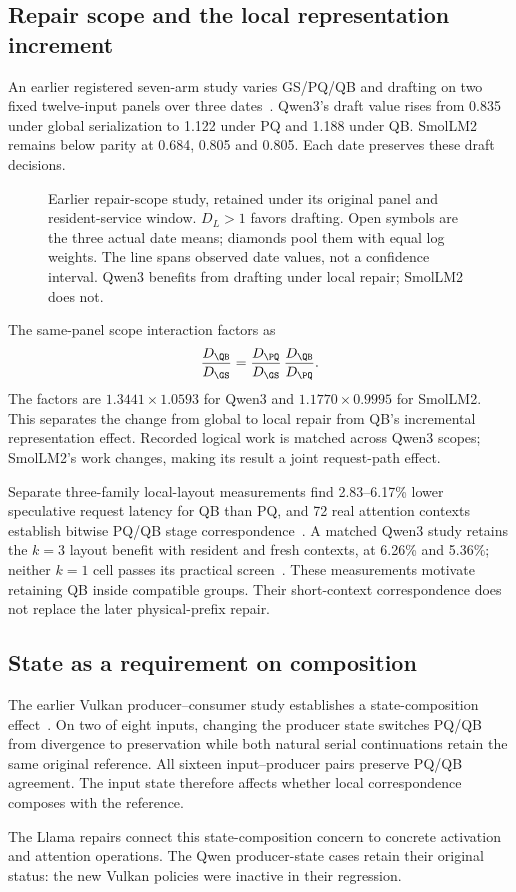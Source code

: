 \subsection{Repair scope and the local representation increment}
An earlier registered seven-arm study varies GS/PQ/QB and drafting on two fixed twelve-input panels over three dates~\cite{rtxscopetransfer}. Qwen3's draft value rises from 0.835 under global serialization to 1.122 under PQ and 1.188 under QB. SmolLM2 remains below parity at 0.684, 0.805 and 0.805. Each date preserves these draft decisions.

\begin{figure}[t]\centering
\resizebox{\textwidth}{!}{}
\caption{Earlier repair-scope study, retained under its original panel and resident-service window. $D_L>1$ favors drafting. Open symbols are the three actual date means; diamonds pool them with equal log weights. The line spans observed date values, not a confidence interval. Qwen3 benefits from drafting under local repair; SmolLM2 does not.}
\label{fig:scope}
\end{figure}

The same-panel scope interaction factors as
\begin{equation}
\frac{D_{\QB}}{D_{\GS}}
=\frac{D_{\PQ}}{D_{\GS}}\,
\frac{D_{\QB}}{D_{\PQ}}.
\end{equation}
The factors are $1.3441\times1.0593$ for Qwen3 and $1.1770\times0.9995$ for SmolLM2. This separates the change from global to local repair from QB's incremental representation effect. Recorded logical work is matched across Qwen3 scopes; SmolLM2's work changes, making its result a joint request-path effect.

Separate three-family local-layout measurements find 2.83--6.17\% lower speculative request latency for QB than PQ, and 72 real attention contexts establish bitwise PQ/QB stage correspondence~\cite{studyrecords}. A matched Qwen3 study retains the $k=3$ layout benefit with resident and fresh contexts, at 6.26\% and 5.36\%; neither $k=1$ cell passes its practical screen~\cite{rtxnativebridge}. These measurements motivate retaining QB inside compatible groups. Their short-context correspondence does not replace the later physical-prefix repair.

\subsection{State as a requirement on composition}
The earlier Vulkan producer--consumer study establishes a state-composition effect~\cite{b570producer}. On two of eight inputs, changing the producer state switches PQ/QB from divergence to preservation while both natural serial continuations retain the same original reference. All sixteen input--producer pairs preserve PQ/QB agreement. The input state therefore affects whether local correspondence composes with the reference.

The Llama repairs connect this state-composition concern to concrete activation and attention operations. The Qwen producer-state cases retain their original status: the new Vulkan policies were inactive in their regression.
